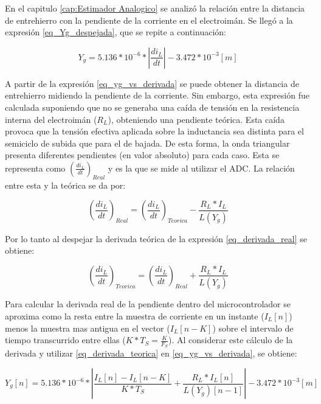 En el capitulo \ref{cap:Estimador Analogico} se analizó la relación entre la distancia de entrehierro con la pendiente de la corriente en el electroimán. Se llegó a la expresión \ref{eq_Yg_despejada}, que se repite a continuación:

\begin{equation} \label{eq_yg_vs_derivada}
	Y_g = 5.136*10^{-6}*|\frac{di_L}{dt}|- 3.472*10^{-3} [m]
\end{equation}

A partir de la expresión \ref{eq_yg_vs_derivada} se puede obtener la distancia de entrehierro midiendo la pendiente de la corriente. Sin embargo, esta expresión fue calculada suponiendo que no se generaba una caída de tensión en la resistencia interna del electroimán ($R_L$), obteniendo una pendiente teórica. Esta caída provoca que la tensión efectiva aplicada sobre la inductancia sea distinta para el semiciclo de subida que para el de bajada. De esta forma, la onda triangular presenta diferentes pendientes (en valor absoluto) para cada caso. Esta se representa como $(\frac{di_L}{dt})_{Real}$ y es la que se mide al utilizar el ADC. La relación entre esta y la teórica se da por:

\begin{equation} \label{eq_derivada_real}
	(\frac{di_L}{dt})_{Real}=(\frac{di_L}{dt})_{Teorica}-\frac{R_L*I_L}{L(Y_g)}
\end{equation}

Por lo tanto al despejar la derivada teórica de la expresión \ref{eq_derivada_real} se obtiene:

\begin{equation} \label{eq_derivada_teorica}
	(\frac{di_L}{dt})_{Teorica}=(\frac{di_L}{dt})_{Real}+\frac{R_L*I_L}{L(Y_g)}
\end{equation}


Para calcular la derivada real de la pendiente dentro del microcontrolador se aproxima como la resta entre la muestra de corriente en un instante ($I_L[n]$) menos la muestra mas antigua en el vector ($I_L[n-K]$) sobre el intervalo de tiempo transcurrido entre ellas ($K*T_S=\frac{K}{F_S}$). Al considerar este cálculo de la derivada y utilizar \ref{eq_derivada_teorica} en \ref{eq_yg_vs_derivada}, se obtiene:

\begin{equation} \label{eq_yg_vs_IL}
	Y_g[n] = 5.136*10^{-6}* |\frac{I_L[n]-I_L[n-K]}{K*T_S}+\frac{R_L*I_L[n]}{L(Y_g)[n-1]}| - 3.472*10^{-3} [m]
\end{equation}

